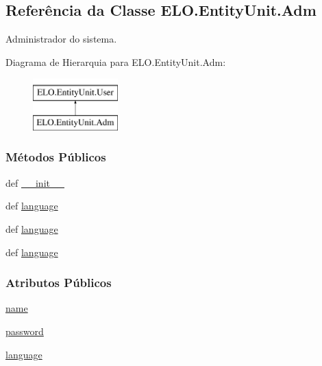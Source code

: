 \hypertarget{classELO_1_1EntityUnit_1_1Adm}{\subsection{Referência da Classe E\-L\-O.\-Entity\-Unit.\-Adm}
\label{classELO_1_1EntityUnit_1_1Adm}
}


Administrador do sistema.  


Diagrama de Hierarquia para E\-L\-O.\-Entity\-Unit.\-Adm\-:\begin{figure}[H]
\begin{center}
\leavevmode
\includegraphics[height=2.000000cm]{d3/d3a/classELO_1_1EntityUnit_1_1Adm}
\end{center}
\end{figure}
\subsubsection*{Métodos Públicos}
\begin{DoxyCompactItemize}
\item 
def \hyperlink{classELO_1_1EntityUnit_1_1Adm_a01e2f40a6af7208831e2b35bf155dc9e}{\-\_\-\-\_\-init\-\_\-\-\_\-}
\item 
def \hyperlink{classELO_1_1EntityUnit_1_1Adm_a32ced0b1c5c7dc5d5b931e568b9d2ece}{language}
\item 
def \hyperlink{classELO_1_1EntityUnit_1_1Adm_a32ced0b1c5c7dc5d5b931e568b9d2ece}{language}
\item 
def \hyperlink{classELO_1_1EntityUnit_1_1Adm_a32ced0b1c5c7dc5d5b931e568b9d2ece}{language}
\end{DoxyCompactItemize}
\subsubsection*{Atributos Públicos}
\begin{DoxyCompactItemize}
\item 
\hyperlink{classELO_1_1EntityUnit_1_1Adm_a12f7aaf17dc6e036186e7757244cd12a}{name}
\item 
\hyperlink{classELO_1_1EntityUnit_1_1Adm_aed97c3f4efa1320ef99b3794b51f8e5e}{password}
\item 
\hyperlink{classELO_1_1EntityUnit_1_1Adm_a2d4b3c7bd74c828fa965f4d840ff7124}{language}
\end{DoxyCompactItemize}


